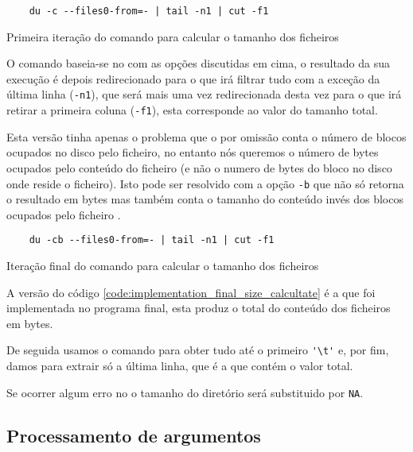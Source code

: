 \begin{listing}[H]
	\centering
	\begin{verbatim}
    du -c --files0-from=- | tail -n1 | cut -f1
  \end{verbatim}
	\caption{Primeira iteração do comando para calcular o tamanho dos ficheiros}
	\label{code:implementation_first_size_calcultate}
\end{listing}

O comando baseia-se no  com as opções discutidas em cima, o
resultado da sua execução é depois redirecionado para o  que
irá filtrar tudo com a exceção da última linha (\Verb|-n1|), que será mais uma
vez redirecionada desta vez para o  que irá retirar a primeira
coluna (\Verb|-f1|), esta corresponde ao valor do tamanho total.

Esta versão tinha apenas o problema que o  por omissão conta o
número de blocos ocupados no disco pelo ficheiro, no entanto nós queremos o
número de bytes ocupados pelo conteúdo do ficheiro (e não o numero de bytes do
bloco no disco onde reside o ficheiro). Isto pode ser resolvido com a opção
\Verb|-b| que não só retorna o resultado em bytes mas também conta o tamanho do
conteúdo invés dos blocos ocupados pelo ficheiro \cite{du_man}.

\begin{listing}[H]
	\centering
	\begin{verbatim}
    du -cb --files0-from=- | tail -n1 | cut -f1
  \end{verbatim}
	\caption{Iteração final do comando para calcular o tamanho dos ficheiros}
	\label{code:implementation_final_size_calcultate}
\end{listing}

A versão do código \ref{code:implementation_final_size_calcultate} é a que foi
implementada no programa final, esta produz o total do conteúdo dos ficheiros em
bytes.

De seguida usamos o comando  para obter tudo até o
primeiro \Verb|'\t'| e, por fim, damos  para extrair
só a última linha, que é a que contém o valor total.

Se ocorrer algum erro no  o tamanho do diretório será substituido por \Verb|NA|.

\subsection{Processamento de argumentos}\label{sec:implementation_arg_parsing}

